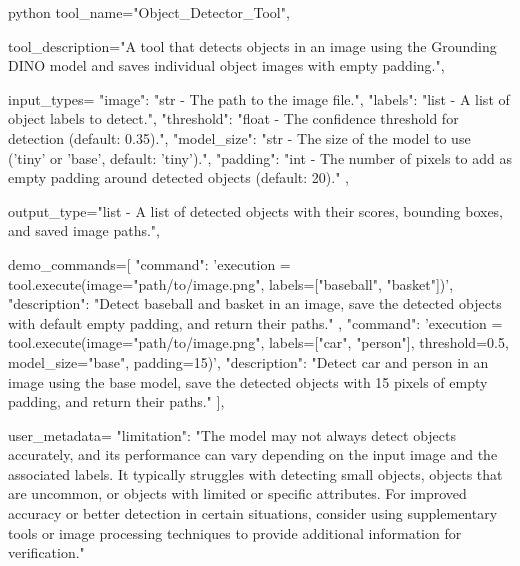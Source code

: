 \begin{codecolorbox}{python}
tool_name="Object_Detector_Tool",

tool_description="A tool that detects objects in an image using the Grounding DINO model and saves individual object images with empty padding.",

input_types={
    "image": "str - The path to the image file.",
    "labels": "list - A list of object labels to detect.",
    "threshold": "float - The confidence threshold for detection (default: 0.35).",
    "model_size": "str - The size of the model to use ('tiny' or 'base', default: 'tiny').",
    "padding": "int - The number of pixels to add as empty padding around detected objects (default: 20)."
},

output_type="list - A list of detected objects with their scores, bounding boxes, and saved image paths.",

demo_commands=[
    {
        "command": 'execution = tool.execute(image="path/to/image.png", labels=["baseball", "basket"])',
        "description": "Detect baseball and basket in an image, save the detected objects with default empty padding, and return their paths."
    },
    {
        "command": 'execution = tool.execute(image="path/to/image.png", labels=["car", "person"], threshold=0.5, model_size="base", padding=15)',
        "description": "Detect car and person in an image using the base model, save the detected objects with 15 pixels of empty padding, and return their paths."
    }
],

user_metadata={
    "limitation": "The model may not always detect objects accurately, and its performance can vary depending on the input image and the associated labels. It typically struggles with detecting small objects, objects that are uncommon, or objects with limited or specific attributes. For improved accuracy or better detection in certain situations, consider using supplementary tools or image processing techniques to provide additional information for verification."
}
\end{codecolorbox}


